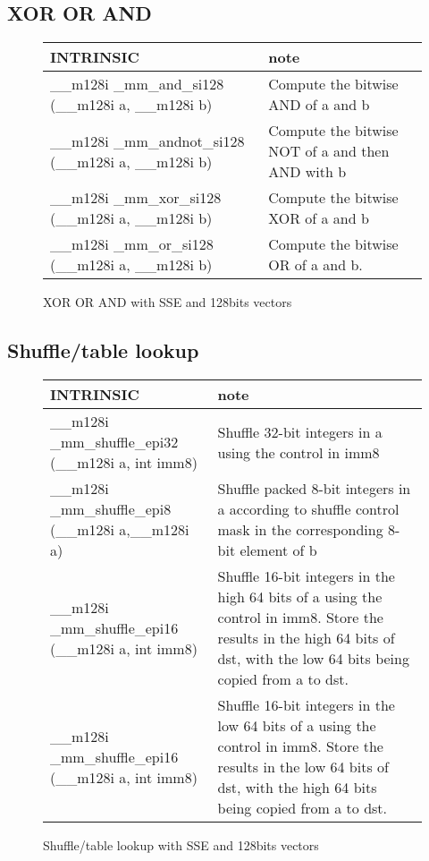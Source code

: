 \documentclass{article}
\begin{document}
\subsection{XOR OR AND}
\vspace{1cm}
\begin{figure}[h!]
\noindent
\noindent\begin{tabular}{|l|l|}
  \hline
  INTRINSIC & note \\
  \hline
\_\_m128i \_mm\_and\_si128 (\_\_m128i a, \_\_m128i b) & Compute the bitwise AND of a and b \\
\hline
\_\_m128i \_mm\_andnot\_si128 (\_\_m128i a, \_\_m128i b) & Compute the bitwise NOT of a and then AND with b \\
\hline
\_\_m128i \_mm\_xor\_si128 (\_\_m128i a, \_\_m128i b) & Compute the bitwise XOR of a and b\\
\hline 
\_\_m128i \_mm\_or\_si128 (\_\_m128i a, \_\_m128i b) & Compute the bitwise OR of a and b.  \\

  \hline
\end{tabular}
    \caption{XOR OR AND with SSE and 128bits vectors}
    \label{fig:set of XOR OR AND 128 instructions}
\end{figure}

\newpage
\subsection{Shuffle/table lookup}
\vspace{1cm}
\begin{figure}[h!]
\noindent
\noindent\begin{tabularx}{\linewidth}{|l|X|}
  \hline
  INTRINSIC & note \\
  \hline
 \_\_m128i \_mm\_shuffle\_epi32 (\_\_m128i a, int imm8)& Shuffle 32-bit integers in a using the control in imm8\\
 \hline
  \_\_m128i \_mm\_shuffle\_epi8 (\_\_m128i a,\_\_m128i a)& Shuffle packed 8-bit integers in a according to shuffle control mask in the corresponding 8-bit element of b\\
  \hline
  \_\_m128i \_mm\_shuffle\_epi16 (\_\_m128i a, int imm8) & Shuffle 16-bit integers in the high 64 bits of a using the control in imm8. Store the results in the high 64 bits of dst, with the low 64 bits being copied from a to dst.\\
  \hline
  \_\_m128i \_mm\_shuffle\_epi16 (\_\_m128i a, int imm8) & Shuffle 16-bit integers in the low 64 bits of a using the control in imm8. Store the results in the low 64 bits of dst, with the high 64 bits being copied from a to dst.\\
  \hline
\end{tabularx}
    \caption{Shuffle/table lookup with SSE and 128bits vectors}
    \label{fig:set of XOR OR AND 128 instructions}
\end{figure}
\end{document}
